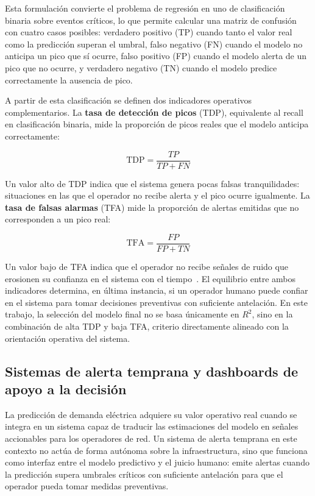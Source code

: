 \documentclass[12pt, a4paper]{article}
\begin{document}
Esta formulación convierte el problema de regresión en uno de clasificación binaria sobre eventos críticos, lo que permite calcular una matriz de confusión con cuatro casos posibles: verdadero positivo (TP) cuando tanto el valor real como la predicción superan el umbral, falso negativo (FN) cuando el modelo no anticipa un pico que sí ocurre, falso positivo (FP) cuando el modelo alerta de un pico que no ocurre, y verdadero negativo (TN) cuando el modelo predice correctamente la ausencia de pico.

A partir de esta clasificación se definen dos indicadores operativos complementarios. La \textbf{tasa de detección de picos} (TDP), equivalente al recall en clasificación binaria, mide la proporción de picos reales que el modelo anticipa correctamente:

\begin{equation}
\text{TDP} = \frac{TP}{TP + FN}
\end{equation}

Un valor alto de TDP indica que el sistema genera pocas falsas tranquilidades: situaciones en las que el operador no recibe alerta y el pico ocurre igualmente. La \textbf{tasa de falsas alarmas} (TFA) mide la proporción de alertas emitidas que no corresponden a un pico real:

\begin{equation}
\text{TFA} = \frac{FP}{FP + TN}
\end{equation}

Un valor bajo de TFA indica que el operador no recibe señales de ruido que erosionen su confianza en el sistema con el tiempo~\cite{maridelolmo2022, yasuhiro2020}. El equilibrio entre ambos indicadores determina, en última instancia, si un operador humano puede confiar en el sistema para tomar decisiones preventivas con suficiente antelación. En este trabajo, la selección del modelo final no se basa únicamente en $R^2$, sino en la combinación de alta TDP y baja TFA, criterio directamente alineado con la orientación operativa del sistema.

\subsection{Sistemas de alerta temprana y dashboards de apoyo a la decisión}

La predicción de demanda eléctrica adquiere su valor operativo real cuando se integra en un sistema capaz de traducir las estimaciones del modelo en señales accionables para los operadores de red. Un sistema de alerta temprana en este contexto no actúa de forma autónoma sobre la infraestructura, sino que funciona como interfaz entre el modelo predictivo y el juicio humano: emite alertas cuando la predicción supera umbrales críticos con suficiente antelación para que el operador pueda tomar medidas preventivas.
\end{document}
